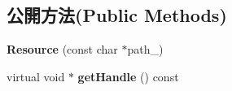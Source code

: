\subsection*{公開方法(Public Methods)}
\begin{DoxyCompactItemize}
\item 
{\bfseries Resource} (const char $\ast$path\+\_\+)\hypertarget{class_magnum_1_1_font_1_1_resource_ac0793d57b2e69dc2541223f61ad6d95e}{}\label{class_magnum_1_1_font_1_1_resource_ac0793d57b2e69dc2541223f61ad6d95e}

\item 
virtual void $\ast$ {\bfseries get\+Handle} () const \hypertarget{class_magnum_1_1_font_1_1_resource_a46f1e33b34b4a6eafc2c1e63124acfa5}{}\label{class_magnum_1_1_font_1_1_resource_a46f1e33b34b4a6eafc2c1e63124acfa5}


\end{DoxyCompactItemize}
